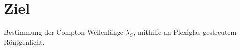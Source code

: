 \section{Ziel}
Bestimmung der Compton-Wellenlänge $\lambda_C$, mithilfe an Plexiglas gestreutem Röntgenlicht.